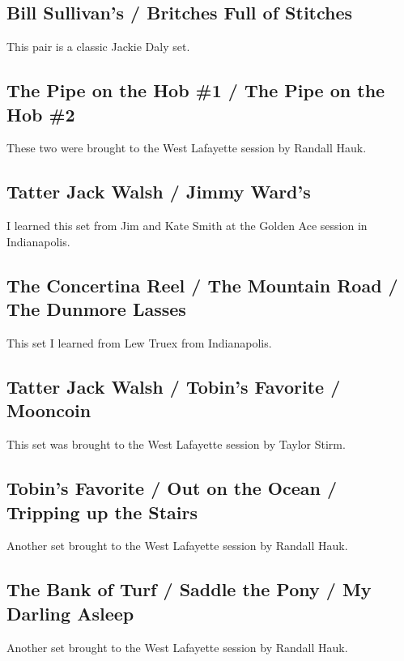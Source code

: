 \documentclass[11pt,letterpaper]{article}
\begin{document}
\subsection*{Bill Sullivan's / Britches Full of Stitches} 

This pair is a classic Jackie Daly set.

\subsection*{The Pipe on the Hob \#1 / The Pipe on the Hob \#2} 

These two were brought to the West Lafayette session by Randall Hauk.

\subsection*{Tatter Jack Walsh / Jimmy Ward's} 

I learned this set from Jim and Kate Smith at the Golden Ace session in Indianapolis.

\subsection*{The Concertina Reel / The Mountain Road / The Dunmore Lasses} 

This set I learned from Lew Truex from Indianapolis.

\subsection*{Tatter Jack Walsh / Tobin's Favorite / Mooncoin} 

This set was brought to the West Lafayette session by Taylor Stirm.

\subsection*{Tobin's Favorite / Out on the Ocean / Tripping up the Stairs} 

Another set brought to the West Lafayette session by Randall Hauk.

\subsection*{The Bank of Turf / Saddle the Pony / My Darling Asleep} 

Another set brought to the West Lafayette session by Randall Hauk.
\end{document}
